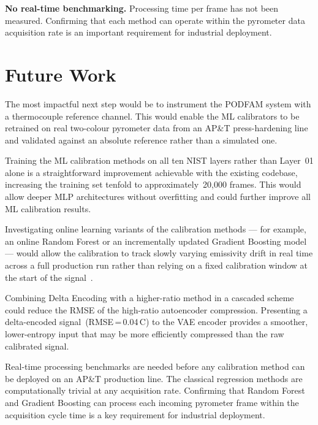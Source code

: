 \textbf{No real-time benchmarking.} Processing time per frame has not been measured. Confirming that each method can operate within the pyrometer data acquisition rate is an important requirement for industrial deployment.

\section{Future Work}
\label{sec:future}

The most impactful next step would be to instrument the PODFAM system with a thermocouple reference channel. This would enable the ML calibrators to be retrained on real two-colour pyrometer data from an AP\&T press-hardening line and validated against an absolute reference rather than a simulated one.

Training the ML calibration methods on all ten NIST layers rather than Layer~01 alone is a straightforward improvement achievable with the existing codebase, increasing the training set tenfold to approximately~20,000 frames. This would allow deeper MLP architectures without overfitting and could further improve all ML calibration results.

Investigating online learning variants of the calibration methods --- for example, an online Random Forest or an incrementally updated Gradient Boosting model --- would allow the calibration to track slowly varying emissivity drift in real time across a full production run rather than relying on a fixed calibration window at the start of the signal~\cite{online_pyrometry_calibration}.

Combining Delta Encoding with a higher-ratio method in a cascaded scheme could reduce the RMSE of the high-ratio autoencoder compression. Presenting a delta-encoded signal~(RMSE\,=\,0.04\,\textdegree C) to the VAE encoder provides a smoother, lower-entropy input that may be more efficiently compressed than the raw calibrated signal.

Real-time processing benchmarks are needed before any calibration method can be deployed on an AP\&T production line. The classical regression methods are computationally trivial at any acquisition rate. Confirming that Random Forest and Gradient Boosting can process each incoming pyrometer frame within the acquisition cycle time is a key requirement for industrial deployment.

\let\cleardoublepage\clearpage
